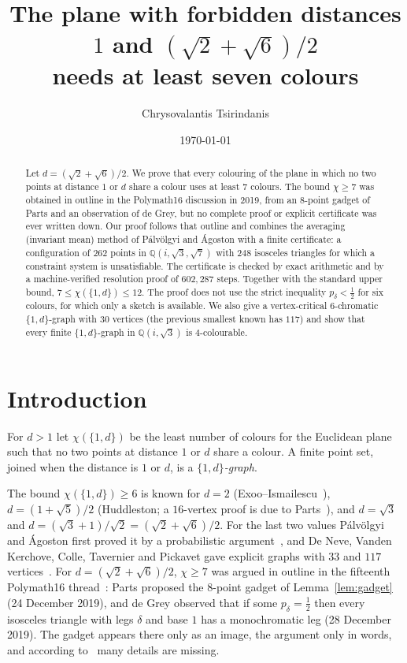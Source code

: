 \documentclass[11pt,a4paper]{amsart}
\title[Two forbidden distances $1$ and $(\sqrt2+\sqrt6)/2$]{The plane with forbidden distances $1$ and $(\sqrt2+\sqrt6)/2$\\ needs at least seven colours}
\author{Chrysovalantis Tsirindanis}
\date{\today}
\theoremstyle{remark}
\newcommand{\Q}{\mathbb{Q}}
\begin{document}
\begin{abstract}
Let $d=(\sqrt2+\sqrt6)/2$. We prove that every colouring of the plane in which no two points at distance $1$ or $d$ share a colour uses at least $7$ colours. The bound $\chi\ge7$ was obtained in outline in the Polymath16 discussion in 2019, from an $8$-point gadget of Parts and an observation of de Grey, but no complete proof or explicit certificate was ever written down. Our proof follows that outline and combines the averaging (invariant mean) method of P\'alv\"olgyi and \'Agoston with a finite certificate: a configuration of $262$ points in $\Q(i,\sqrt3,\sqrt7)$ with $248$ isosceles triangles for which a constraint system is unsatisfiable. The certificate is checked by exact arithmetic and by a machine-verified resolution proof of $602{,}287$ steps. Together with the standard upper bound, $7\le\chi(\{1,d\})\le12$. The proof does not use the strict inequality $p_\delta<\tfrac12$ for six colours, for which only a sketch is available. We also give a vertex-critical $6$-chromatic $\{1,d\}$-graph with $30$ vertices (the previous smallest known has $117$) and show that every finite $\{1,d\}$-graph in $\Q(i,\sqrt3)$ is $4$-colourable.
\end{abstract}

\maketitle

\section{Introduction}

For $d>1$ let $\chi(\{1,d\})$ be the least number of colours for the Euclidean plane such that no two points at distance $1$ or $d$ share a colour. A finite point set, joined when the distance is $1$ or $d$, is a \emph{$\{1,d\}$-graph}.

The bound $\chi(\{1,d\})\ge6$ is known for $d=2$ (Exoo--Ismailescu~\cite{EI19}), $d=(1+\sqrt5)/2$ (Huddleston; a $16$-vertex proof is due to Parts~\cite{Pa20}), and $d=\sqrt3$ and $d=(\sqrt3+1)/\sqrt2=(\sqrt2+\sqrt6)/2$. For the last two values P\'alv\"olgyi and \'Agoston first proved it by a probabilistic argument~\cite{Pa20}, and De Neve, Vanden Kerchove, Colle, Tavernier and Pickavet gave explicit graphs with $33$ and $117$ vertices~\cite{DN25}. For $d=(\sqrt2+\sqrt6)/2$, $\chi\ge7$ was argued in outline in the fifteenth Polymath16 thread~\cite{PM15}: Parts proposed the $8$-point gadget of Lemma~\ref{lem:gadget} (24 December 2019), and de Grey observed that if some $p_\delta=\tfrac12$ then every isosceles triangle with legs $\delta$ and base $1$ has a monochromatic leg (28 December 2019). The gadget appears there only as an image, the argument only in words, and according to~\cite{DN25} many details are missing.
\end{document}
